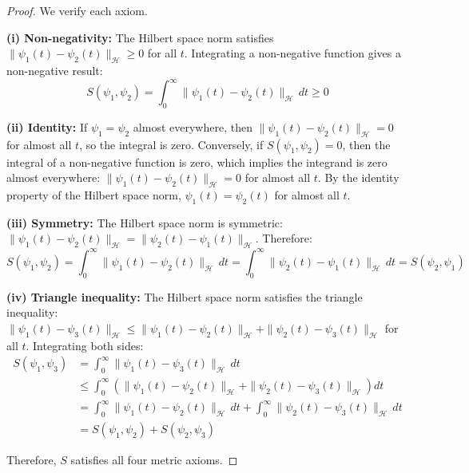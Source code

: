 \begin{proof}
We verify each axiom.

\textbf{(i) Non-negativity:} The Hilbert space norm satisfies $\|\psi_1(t) - \psi_2(t)\|_{\mathcal{H}} \geq 0$ for all $t$. Integrating a non-negative function gives a non-negative result:
\begin{equation}
S(\psi_1, \psi_2) = \int_0^{\infty} \|\psi_1(t) - \psi_2(t)\|_{\mathcal{H}} \, dt \geq 0
\end{equation}

\textbf{(ii) Identity:} If $\psi_1 = \psi_2$ almost everywhere, then $\|\psi_1(t) - \psi_2(t)\|_{\mathcal{H}} = 0$ for almost all $t$, so the integral is zero. Conversely, if $S(\psi_1, \psi_2) = 0$, then the integral of a non-negative function is zero, which implies the integrand is zero almost everywhere: $\|\psi_1(t) - \psi_2(t)\|_{\mathcal{H}} = 0$ for almost all $t$. By the identity property of the Hilbert space norm, $\psi_1(t) = \psi_2(t)$ for almost all $t$.

\textbf{(iii) Symmetry:} The Hilbert space norm is symmetric: $\|\psi_1(t) - \psi_2(t)\|_{\mathcal{H}} = \|\psi_2(t) - \psi_1(t)\|_{\mathcal{H}}$. Therefore:
\begin{equation}
S(\psi_1, \psi_2) = \int_0^{\infty} \|\psi_1(t) - \psi_2(t)\|_{\mathcal{H}} \, dt = \int_0^{\infty} \|\psi_2(t) - \psi_1(t)\|_{\mathcal{H}} \, dt = S(\psi_2, \psi_1)
\end{equation}

\textbf{(iv) Triangle inequality:} The Hilbert space norm satisfies the triangle inequality: $\|\psi_1(t) - \psi_3(t)\|_{\mathcal{H}} \leq \|\psi_1(t) - \psi_2(t)\|_{\mathcal{H}} + \|\psi_2(t) - \psi_3(t)\|_{\mathcal{H}}$ for all $t$. Integrating both sides:
\begin{align}
S(\psi_1, \psi_3) &= \int_0^{\infty} \|\psi_1(t) - \psi_3(t)\|_{\mathcal{H}} \, dt \\
&\leq \int_0^{\infty} \left( \|\psi_1(t) - \psi_2(t)\|_{\mathcal{H}} + \|\psi_2(t) - \psi_3(t)\|_{\mathcal{H}} \right) dt \\
&= \int_0^{\infty} \|\psi_1(t) - \psi_2(t)\|_{\mathcal{H}} \, dt + \int_0^{\infty} \|\psi_2(t) - \psi_3(t)\|_{\mathcal{H}} \, dt \\
&= S(\psi_1, \psi_2) + S(\psi_2, \psi_3)
\end{align}

Therefore, $S$ satisfies all four metric axioms.
\end{proof}

